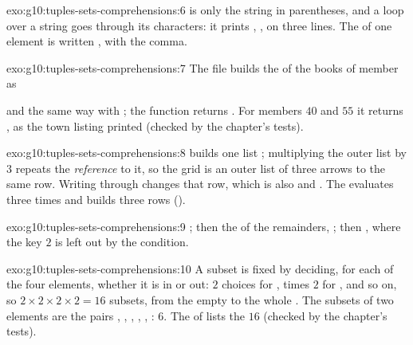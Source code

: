 \begin{solution}{exo:g10:tuples-sets-comprehensions:6}
 is only the string  in parentheses, and a loop over a string goes through its characters:
it prints , ,  on three lines. The  of one element is written , with the
comma.
\end{solution}

\begin{solution}{exo:g10:tuples-sets-comprehensions:7}
The file  builds the  of the books of member  as

\smallskip\noindent\hspace*{2em}

\smallskip\noindent and  the same way with ; the function returns . For members $40$ and $55$ it returns , as the
town listing printed (checked by the chapter's tests).
\end{solution}

\begin{solution}{exo:g10:tuples-sets-comprehensions:8}
 builds one list \code{[0, 0, 0]}; multiplying the outer list by $3$ repeats the \emph{reference} to
it, so the grid is an outer list of three arrows to the same row. Writing through  changes that row,
which is also  and . The   evaluates
 three times and builds three rows ().
\end{solution}

\begin{solution}{exo:g10:tuples-sets-comprehensions:9}
; then the  of the remainders, ; then
, where the key $2$ is left out by the condition.
\end{solution}

\begin{solution}{exo:g10:tuples-sets-comprehensions:10}
A subset is fixed by deciding, for each of the four elements, whether it is in or out: $2$ choices for ,
times $2$ for , and so on, so $2 \times 2 \times 2 \times 2 = 16$ subsets, from the empty  to the whole
. The subsets of two elements are the pairs , , , , , : $6$.
The  of  lists the $16$ (checked by the chapter's tests).
\end{solution}

